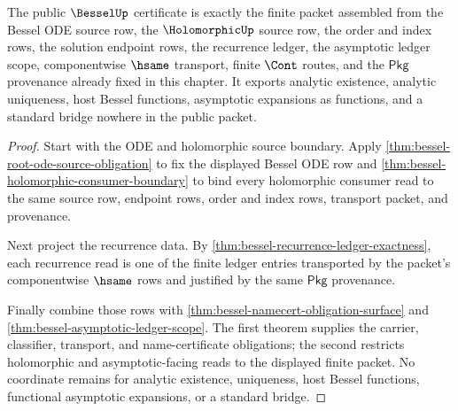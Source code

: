 \begin{theorem}
\label{thm:bessel-public-certificate-export}
The public $\BesselUp$ certificate is exactly the finite packet assembled from
the Bessel ODE source row, the $\HolomorphicUp$ source row, the order and index
rows, the solution endpoint rows, the recurrence ledger, the asymptotic ledger
scope, componentwise $\hsame$ transport, finite $\Cont$ routes, and the
$\mathsf{Pkg}$ provenance already fixed in this chapter. It exports analytic
existence, analytic uniqueness, host Bessel functions, asymptotic expansions as
functions, and a standard bridge nowhere in the public packet.
\end{theorem}
\begin{proof}
Start with the ODE and holomorphic source boundary. Apply
\autoref{thm:bessel-root-ode-source-obligation} to fix the displayed Bessel ODE
row and \autoref{thm:bessel-holomorphic-consumer-boundary} to bind every
holomorphic consumer read to the same source row, endpoint rows, order and
index rows, transport packet, and provenance.

Next project the recurrence data. By
\autoref{thm:bessel-recurrence-ledger-exactness}, each recurrence read is one
of the finite ledger entries transported by the packet's componentwise
$\hsame$ rows and justified by the same $\mathsf{Pkg}$ provenance.

Finally combine those rows with
\autoref{thm:bessel-namecert-obligation-surface} and
\autoref{thm:bessel-asymptotic-ledger-scope}. The first theorem supplies the
carrier, classifier, transport, and name-certificate obligations; the second
restricts holomorphic and asymptotic-facing reads to the displayed finite
packet. No coordinate remains for analytic existence, uniqueness, host Bessel
functions, functional asymptotic expansions, or a standard bridge.
\end{proof}

